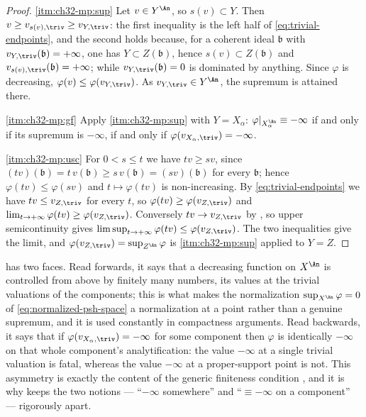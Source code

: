 \begin{proof}
\cref{itm:ch32-mp:sup}  Let $v\in Y^{\An}$, so $s(v)\subset Y$.  Then
$v\geq v_{s(v),\triv}\geq v_{Y,\triv}$: the first inequality is the left
half of \eqref{eq:trivial-endpoints}, and the second holds because, for a
coherent ideal $\mathfrak b$ with
$v_{Y,\triv}(\mathfrak b)=+\infty$, one has $Y\subset Z(\mathfrak b)$,
hence $s(v)\subset Z(\mathfrak b)$ and
$v_{s(v),\triv}(\mathfrak b)=+\infty$; while
$v_{Y,\triv}(\mathfrak b)=0$ is dominated by anything.  Since $\varphi$
is decreasing, $\varphi(v)\leq\varphi(v_{Y,\triv})$.  As
$v_{Y,\triv}\in Y^{\An}$, the supremum is attained there.

\cref{itm:ch32-mp:gf}  Apply \cref{itm:ch32-mp:sup} with $Y=X_\alpha$:
$\varphi|_{X_\alpha^{\An}}\equiv-\infty$ if and only if its supremum is
$-\infty$, if and only if $\varphi(v_{X_\alpha,\triv})=-\infty$.

\cref{itm:ch32-mp:usc}  For $0<s\leq t$ we have $tv\geq sv$, since
$(tv)(\mathfrak b)=t\,v(\mathfrak b)\geq s\,v(\mathfrak b)=(sv)(\mathfrak b)$
for every $\mathfrak b$; hence $\varphi(tv)\leq\varphi(sv)$ and
$t\mapsto\varphi(tv)$ is non-increasing.  By
\eqref{eq:trivial-endpoints} we have $tv\leq v_{Z,\triv}$ for every
$t$, so $\varphi(tv)\geq\varphi(v_{Z,\triv})$ and
$\lim_{t\to+\infty}\varphi(tv)\geq\varphi(v_{Z,\triv})$.  Conversely
$tv\to v_{Z,\triv}$ by , so upper
semicontinuity gives
$\limsup_{t\to+\infty}\varphi(tv)\leq\varphi(v_{Z,\triv})$.  The two
inequalities give the limit, and
$\varphi(v_{Z,\triv})=\sup_{Z^{\An}}\varphi$ is
\cref{itm:ch32-mp:sup} applied to $Y=Z$.
\end{proof}

\begin{remark}
\label{rem:ch32-maximum-principle-reading}
 has two faces.  Read forwards, it says
that a decreasing function on $X^{\An}$ is controlled from above by
finitely many numbers, its values at the trivial valuations of the
components; this is what makes the normalization
$\sup_{X^{\An}}\varphi=0$ of \eqref{eq:normalized-psh-space} a normalization
at a point rather than a genuine supremum, and it is used constantly in
compactness arguments.  Read backwards, it says that if
$\varphi(v_{X_\alpha,\triv})=-\infty$ for some component then $\varphi$
is identically $-\infty$ on that whole component's analytification: the
value $-\infty$ at a single trivial valuation is fatal, whereas the value
$-\infty$ at a proper-support point is not.  This asymmetry is exactly the
content of the generic finiteness condition
, and it is why  keeps the two
notions --- ``$-\infty$ somewhere'' and ``$\equiv-\infty$ on a
component'' --- rigorously apart.
\end{remark}

